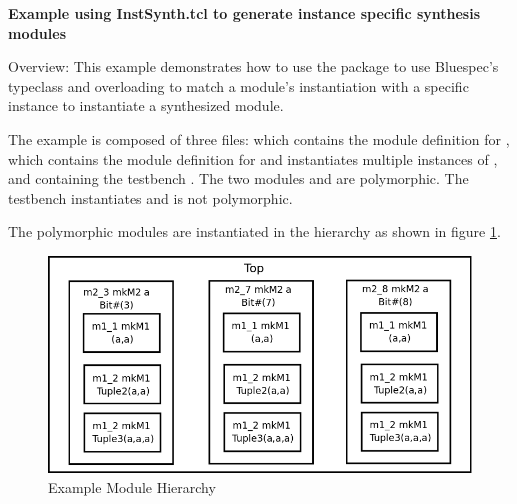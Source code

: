 {\bf Example using InstSynth.tcl to generate instance
specific synthesis modules}

Overview:
This example demonstrates how to use the  package to use
Bluespec's  typeclass and overloading to
match a module's instantiation with a specific instance to
instantiate a synthesized module.

The example is composed of three  files:  which
contains  the
module definition for ,  which contains the module
definition for  and instantiates multiple instances of
, and  containing the testbench .  The
two modules  and  are polymorphic.  The testbench
 instantiates  and is not polymorphic.  

The polymorphic modules are instantiated in the hierarchy as shown in
figure \ref{hierarchy}.

\begin{figure}[ht]
\begin{center}
\includegraphics[width = 4 in]{figures/hierarchy}
\caption{Example Module Hierarchy}
\label{hierarchy}
\end{center}
\end{figure}

